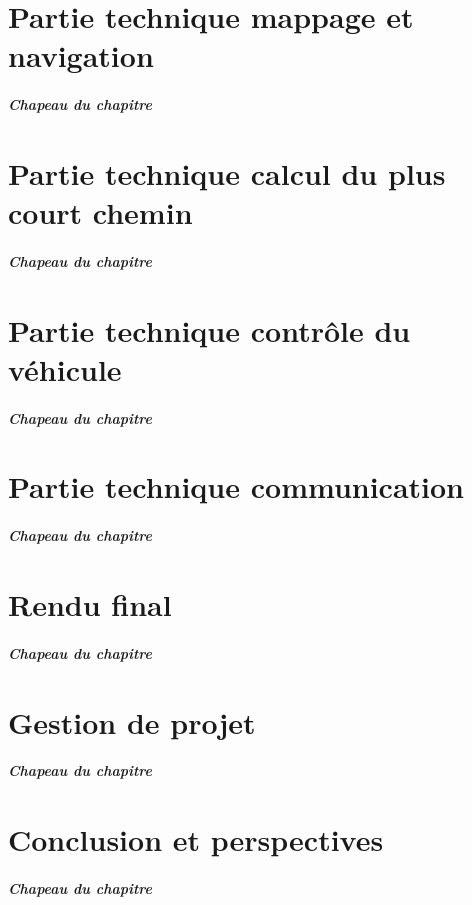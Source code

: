 \documentclass[12pt, french]{report}
\begin{document}
\chapter{Partie technique mappage et navigation}
\paragraph{Chapeau du chapitre}

\clearpage

\chapter{Partie technique calcul du plus court chemin}
\paragraph{Chapeau du chapitre}

\clearpage

\chapter{Partie technique contrôle du véhicule}
\paragraph{Chapeau du chapitre}

\clearpage

\chapter{Partie technique communication}
\paragraph{Chapeau du chapitre}

\clearpage

\chapter{Rendu final}
\paragraph{Chapeau du chapitre}

\clearpage

\chapter{Gestion de projet}
\paragraph{Chapeau du chapitre}

\clearpage

\chapter{Conclusion et perspectives}
\paragraph{Chapeau du chapitre}

\clearpage



\clearpage


\clearpage
\end{document}
